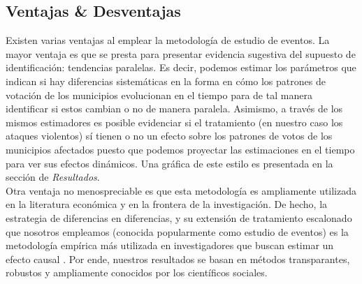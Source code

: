 \documentclass[a4paper]{article}
\begin{document}

\subsection{Ventajas \& Desventajas}
Existen varias ventajas al emplear la metodología de estudio de eventos. La mayor ventaja es que se presta para presentar evidencia sugestiva del supuesto de identificación: tendencias paralelas. Es decir, podemos estimar los parámetros que indican si hay diferencias sistemáticas en la forma en cómo los patrones de votación de los municipios evolucionan en el tiempo para de tal manera identificar si estos cambian o no de manera paralela. Asimismo, a través de los mismos estimadores es posible evidenciar si el tratamiento (en nuestro caso los ataques violentos) sí tienen o no un efecto sobre los patrones de votos de los municipios afectados puesto que podemos proyectar las estimaciones en el tiempo para ver sus efectos dinámicos. Una gráfica de este estilo es presentada en la sección de \textit{Resultados}. \\

Otra ventaja no menospreciable es que esta metodología es ampliamente utilizada en la literatura económica y en la frontera de la investigación. De hecho, la estrategia de diferencias en diferencias, y su extensión de tratamiento escalonado que nosotros empleamos (conocida popularmente como estudio de eventos) es la metodología empírica más utilizada en investigadores que buscan estimar un efecto causal \cite{Angrist2022EmpiricalEffect}. Por ende, nuestros resultados se basan en métodos transparantes, robustos y ampliamente conocidos por los científicos sociales. \\
\end{document}
